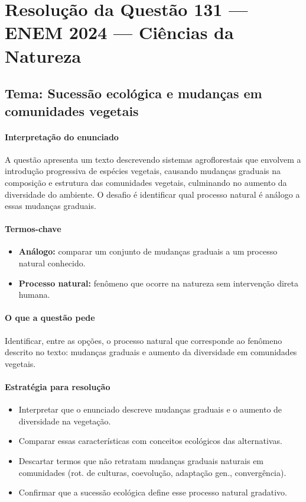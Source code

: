 \documentclass{article}
\begin{document}
\section*{Resolução da Questão 131 — ENEM 2024 — Ciências da Natureza}

\subsection*{Tema: Sucessão ecológica e mudanças em comunidades vegetais}

\paragraph{Interpretação do enunciado}
A questão apresenta um texto descrevendo sistemas agroflorestais que envolvem a introdução progressiva de espécies vegetais, causando mudanças graduais na composição e estrutura das comunidades vegetais, culminando no aumento da diversidade do ambiente. O desafio é identificar qual processo natural é análogo a essas mudanças graduais.

\paragraph{Termos-chave}
\begin{itemize}
  \item \textbf{Análogo:} comparar um conjunto de mudanças graduais a um processo natural conhecido.
  \item \textbf{Processo natural:} fenômeno que ocorre na natureza sem intervenção direta humana.
\end{itemize}

\paragraph{O que a questão pede}
Identificar, entre as opções, o processo natural que corresponde ao fenômeno descrito no texto: mudanças graduais e aumento da diversidade em comunidades vegetais.

\paragraph{Estratégia para resolução}
\begin{itemize}
  \item Interpretar que o enunciado descreve mudanças graduais e o aumento de diversidade na vegetação.
  \item Comparar essas características com conceitos ecológicos das alternativas.
  \item Descartar termos que não retratam mudanças graduais naturais em comunidades (rot. de culturas, coevolução, adaptação gen., convergência).
  \item Confirmar que a sucessão ecológica define esse processo natural gradativo.
\end{itemize}
\end{document}
